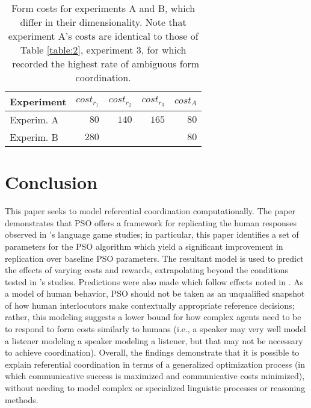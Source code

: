\documentclass[a4paper,11pt]{article}
\begin{document}
\begin{table}
\begin{center}
    \begin{tabular}{ l r r r r }
    Experiment & $cost_{r_1}$ & $cost_{r_2}$ & $cost_{r_3}$ & $cost_A$\\ \hline
    Experim. A & $80$  & $140$ & $165$ & $80$ \\ \hline
    Experim. B & $280$ &       &       & $80$ \\ \hline
    \end{tabular}
    \caption{Form costs for experiments A and B, which differ in their dimensionality. Note that experiment A's costs are identical to those of Table \ref{table:2}, experiment 3, for which \citeauthor{rohde2012}\ recorded the highest rate of ambiguous form coordination.}
    \label{table:4}
\end{center}
\end{table}



\section{Conclusion}
This paper seeks to model referential coordination computationally. The paper demonstrates that PSO offers a framework for replicating the human responses observed in \citeauthor{rohde2012}'s \citeyear{rohde2012} language game studies; in particular, this paper identifies a set of parameters for the PSO algorithm which yield a significant improvement in replication over baseline PSO parameters. The resultant model is used to predict the effects of varying costs and rewards, extrapolating beyond the conditions tested in \citeauthor{rohde2012}'s studies. Predictions were also made which follow effects noted in \citeauthor{brennan1996}. As a model of human behavior, PSO should not be taken as an unqualified snapshot of how human interlocutors make contextually appropriate reference decisions; rather, this modeling suggests a lower bound for how complex agents need to be to respond to form costs similarly to humans (i.e., a speaker may very well model a listener modeling a speaker modeling a listener, but that may not be necessary to achieve coordination). Overall, the findings demonstrate that it is possible to explain referential coordination in terms of a generalized optimization process (in which communicative success is maximized and communicative costs minimized), without needing to model complex or specialized linguistic processes or reasoning methods.







\end{document}
